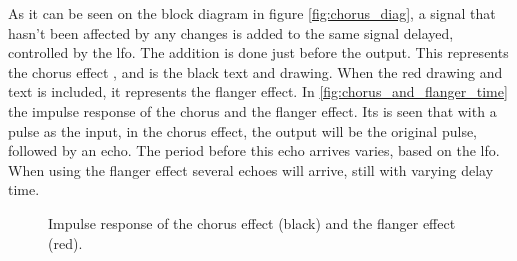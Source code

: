 As it can be seen on the block diagram in figure \autoref{fig:chorus_diag}, a signal that hasn't been affected by any changes is added to the same signal delayed, controlled by the \gls{lfo}. The addition is done just before the output. This represents the chorus effect \citep{chorus_projectpaper}, and is the black text and drawing. When the red drawing and text is included, it represents the flanger effect. In \autoref{fig:chorus_and_flanger_time} the impulse response of the chorus and the flanger effect. Its is seen that with a pulse as the input, in the chorus effect, the output will be the original pulse, followed by an echo. The period before this echo arrives varies, based on the \gls{lfo}. When using the flanger effect several echoes will arrive, still with varying delay time. 

\begin{figure}[htbp!]
\centering
\def\svgwidth{\columnwidth}
\scalebox{0.8}{}
\caption{Impulse response of the chorus effect (black) and the flanger effect (red).}
		\label{fig:chorus_and_flanger_time}
\end{figure}










